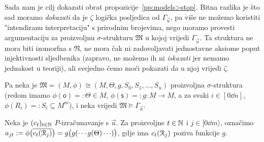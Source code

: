 Sada nam je cilj dokazati obrat propozicije~\ref{pp:models>stop}. Bitna razlika je što sad moramo \emph{dokazati} da je $\zeta$ logička posljedica od $\Gamma_{\vec u}$, pa više ne možemo koristiti "intendiranu interpretaciju" s prirodnim brojevima, nego moramo provesti argumentaciju za proizvoljnu $\sigma$-strukturu $\mathfrak M$ u kojoj vrijedi $\Gamma_{\vec u}$. Ta struktura ne mora biti izomorfna s $\mathfrak N$, ne mora čak ni zadovoljavati jednostavne aksiome poput injektivnosti sljedbenika (zapravo, ne možemo ih ni \emph{iskazati} jer nemamo jednakost u teoriji), ali svejedno ćemo moći pokazati da u njoj vrijedi $\zeta$.

Pa neka je $\mathfrak M=(M,\phi)\cong(M,\Theta,g,S_0,S_1,\dotsc,S_n)$ proizvoljna $\sigma$-struktura (redom imamo $\phi(\mathsf o)=:\Theta\in M$, $\phi(\mathsf s)=:g:M\to M$, a za svaki $i\in[0\dd n]$, $\phi(R_i)=:S_i\subseteq M^m$), i neka vrijedi $\mathfrak M\models\Gamma_{\vec u}$.

Neka je $(c_t)_{t\in{\mathbb N}}$ $P$-izračunavanje s $\vec u$. Za proizvoljne $t\in{\mathbb N}$ i $j\in[0\dd m\rangle$, označimo $a_{jt}:=\phi\bigl(\overline{c_t(\mathcal R_{j})}\bigr)=g\bigl(g(\dotsb g(\Theta)\dotsb\mspace{-1mu})\bigr)$, gdje ima $c_t(\mathcal R_{j})$ poziva funkcije $g$.

